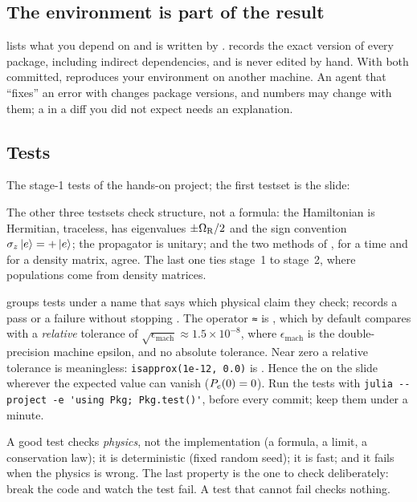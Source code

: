 \subsection{The environment is part of the result}

 lists what you depend on and is written by .
 records the exact version of every package, including indirect
dependencies, and is never edited by hand. With both committed,
 reproduces your environment on another machine. An agent that
``fixes'' an error with  changes package versions, and numbers may change
with them; a  in a diff you did not expect needs an explanation.

\subsection{Tests}

The stage-1 tests of the hands-on project; the first testset is the slide:

The other three testsets check structure, not a formula: the Hamiltonian is Hermitian,
traceless, has eigenvalues $\pm\Omega_{\mathrm{R}}/2$ and the sign convention $\sigma_z\ket{e} =
+\ket{e}$; the propagator is unitary; and the two methods of ,
for a time and for a density matrix, agree. The last one ties stage~1 to stage~2, where
populations come from density matrices.

 groups tests under a name that says which physical claim they check;
 records a pass or a failure without stopping . The operator
\lstinline|≈| is , which by default compares with a \emph{relative} tolerance
of $\sqrt{\epsilon_{\mathrm{mach}}} \approx 1.5 \times 10^{-8}$, where $\epsilon_{\mathrm{mach}}$ is the
double-precision machine epsilon, and no absolute tolerance. Near zero a relative tolerance is
meaningless: \verb|isapprox(1e-12, 0.0)| is . Hence the  on the
slide wherever the expected value can vanish ($P_e(0) = 0$). Run the tests with
\verb|julia --project -e 'using Pkg; Pkg.test()'|, before every commit; keep them under a
minute.

A good test checks \emph{physics}, not the implementation (a formula, a limit, a
conservation law); it is deterministic (fixed random seed); it is fast; and it fails when
the physics is wrong. The last property is the one to check deliberately: break the code
and watch the test fail. A test that cannot fail checks nothing.


